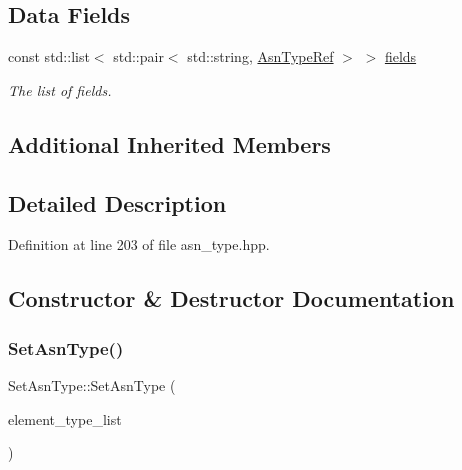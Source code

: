 \subsection*{Data Fields}
\begin{DoxyCompactItemize}
\item 
const std\+::list$<$ std\+::pair$<$ std\+::string, \hyperlink{asn__type_8hpp_a456d7cf50c15d087cc0428ae80834b35}{Asn\+Type\+Ref} $>$ $>$ \hyperlink{classSetAsnType_ae12f92b33040638cabb96f2e04ded0db}{fields}
\begin{DoxyCompactList}\small\item\em The list of fields. \end{DoxyCompactList}\end{DoxyCompactItemize}
\subsection*{Additional Inherited Members}


\subsection{Detailed Description}


Definition at line 203 of file asn\+\_\+type.\+hpp.



\subsection{Constructor \& Destructor Documentation}
\mbox{\label{classSetAsnType_a6b9b1a9a2ca78fbdcf02bc60c7107d1f}} 
\subsubsection{\texorpdfstring{Set\+Asn\+Type()}{SetAsnType()}}
{\footnotesize\ttfamily Set\+Asn\+Type\+::\+Set\+Asn\+Type (\begin{DoxyParamCaption}\item[{std\+::list$<$ std\+::pair$<$ std\+::string, \hyperlink{asn__type_8hpp_a456d7cf50c15d087cc0428ae80834b35}{Asn\+Type\+Ref} $>$$>$}]{element\+\_\+type\+\_\+list }\end{DoxyParamCaption})\hspace{0.3cm}{\ttfamily [explicit]}}



